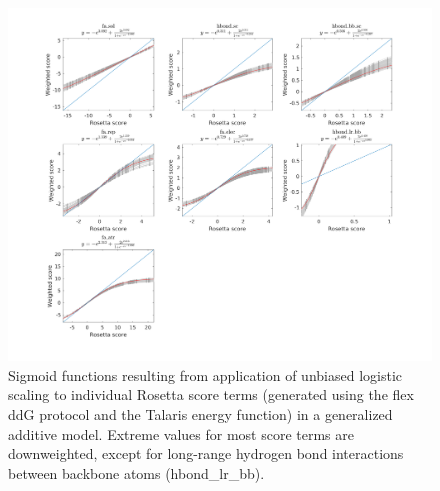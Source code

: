 \documentclass{article}
\newcommand\ddg{$\Delta\Delta G$}
\begin{document}

\begin{figure}
  \centering
  \includegraphics[width=\textwidth,keepaspectratio]{figures/zemu-sigmoid2-tal-feats.png}
  \caption[Sigmoid fit Rosetta score function terms]{
    Sigmoid functions resulting from application of unbiased logistic scaling to individual Rosetta score terms (generated using the flex ddG protocol and the Talaris energy function) in a generalized additive model. Extreme values for most score terms are downweighted, except for long-range hydrogen bond interactions between backbone atoms (hbond\_lr\_bb).
  } \label{fig:t14-fits-feats}
\end{figure}
\end{document}
